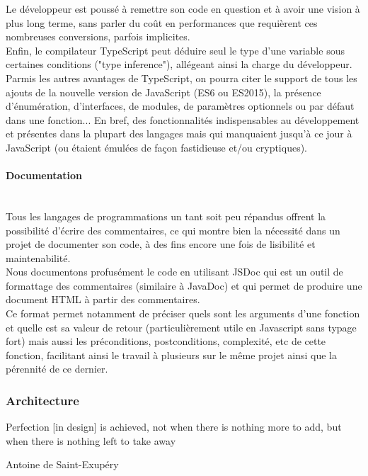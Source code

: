 \documentclass[a4paper,french,12pt]{article}
\begin{document}
	Le développeur est poussé à remettre son code en question et à avoir une vision à plus long terme, sans parler du coût en performances que requièrent ces nombreuses conversions, parfois implicites.~\\
	
	 Enfin, le compilateur TypeScript peut déduire seul le type d'une variable sous certaines conditions ("type inference"), allégeant ainsi la charge du développeur.~\\
	 
	 Parmis les autres avantages de TypeScript, on pourra citer le support de tous les ajouts de la nouvelle version de JavaScript (ES6 ou ES2015), la présence d'énumération, d'interfaces, de modules, de paramètres optionnels ou par défaut dans une fonction... En bref, des fonctionnalités indispensables au développement et présentes dans la plupart des langages mais qui manquaient jusqu'à ce jour à JavaScript (ou étaient émulées de façon fastidieuse et/ou cryptiques). 
	
	\paragraph{Documentation}~\\	
		Tous les langages de programmations un tant soit peu répandus offrent la possibilité d'écrire des commentaires, ce qui montre bien la nécessité dans un projet de documenter son code, à des fins encore une fois de lisibilité et maintenabilité.~\\	
		
		Nous documentons profusément le code en utilisant JSDoc qui est un outil de formattage des commentaires (similaire à JavaDoc) et qui permet de produire une document HTML à partir des commentaires.~\\	
		
	Ce format permet notamment de préciser quels sont les arguments d'une fonction et quelle est sa valeur de retour (particulièrement utile en Javascript sans typage fort) mais aussi les préconditions, postconditions, complexité, etc de cette fonction, facilitant ainsi le travail à plusieurs sur le même projet ainsi que la pérennité de ce dernier.

	\subsubsection{Architecture}
	\epigraph{Perfection [in design] is achieved, not when there is nothing more to add, but when there is nothing left to take away}{Antoine de Saint-Exupéry}
	
\end{document}
